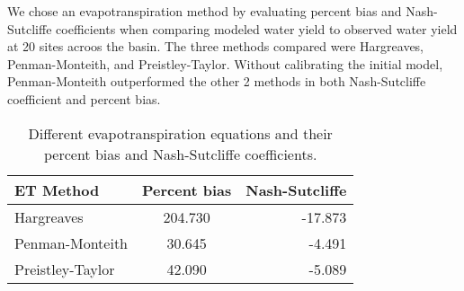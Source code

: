 We chose an evapotranspiration method by evaluating percent bias and Nash-Sutcliffe coefficients when comparing modeled water yield to observed water yield at 20 sites acroos the basin. The three methods compared were Hargreaves, Penman-Monteith, and Preistley-Taylor. Without calibrating the initial model, Penman-Monteith outperformed the other 2 methods in both Nash-Sutcliffe coefficient and percent bias. 
\begin{table}[h!]
	\caption[Different evapotranspiration equations ]{Different evapotranspiration equations and their percent bias and Nash-Sutcliffe coefficients.}
	\centering
		\begin{tabular}{ l c r }
		\hline
			ET Method         &	Percent bias & Nash-Sutcliffe \\
			\hline	\hline
			Hargreaves        &	204.730	& 	-17.873	\\
			Penman-Monteith	  &	30.645	&	-4.491 	\\
			Preistley-Taylor  &	42.090	&	-5.089 	\\
			\hline
		\end{tabular}
		\label{table:et_method}
	\end{table}	